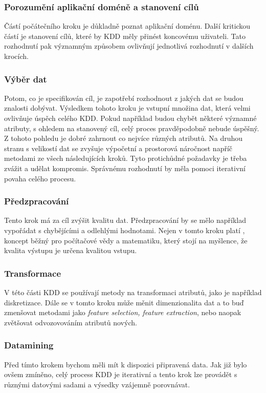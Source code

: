 \documentclass[thesis=M,czech]{FITthesis}[2012/06/26]
\begin{document}
\subsubsection*{Porozumění aplikační doméně a stanovení cílů}
Částí počátečního kroku je důkladně poznat aplikační doménu. Další kritickou částí je stanovení cílů, které by KDD měly přinést koncovému uživateli. Tato rozhodnutí pak významným způsobem ovlivňují jednotlivá rozhodnutí v dalších krocích.
 		
\subsubsection*{Výběr dat}
Potom, co je specifikován cíl, je zapotřebí rozhodnout z jakých dat se budou znalosti dobývat. 
Výsledkem tohoto kroku je vstupní množina dat, která velmi ovlivňuje úspěch celého KDD. Pokud například budou chybět některé významné atributy, s ohledem na stanovený cíl, celý proces pravděpodobně nebude úspěšný. Z tohoto pohledu je dobré zahrnout co nejvíce různých atributů. Na druhou stranu s velikostí dat se zvyšuje výpočetní a prostorová náročnost napříč metodami ze všech následujících kroků. Tyto protichůdné požadavky je třeba zvážit a udělat kompromis. Správnému rozhodnutí by měla pomoci iterativní povaha celého procesu.

\subsubsection*{Předzpracování}
Tento krok má za cíl zvýšit kvalitu dat. Předzpracování by se mělo například vypořádat s chybějícími a odlehlými hodnotami. Nejen v tomto kroku platí , koncept běžný pro počítačové vědy a matematiku, který stojí na myšlence, že kvalita výstupu je určena kvalitou vstupu\cite{g_in_g_out}.

\subsubsection*{Transformace }
\label{subsec:transformace}

V této části KDD se používají metody na transformaci atributů, jako je například diskretizace. Dále se v tomto kroku může měnit dimenzionalita dat a to buď zmenšovat metodami jako \textit{feature selection, feature extraction}, nebo naopak zvětšovat odvozovováním atributů nových. 


\subsubsection*{Datamining}
Před tímto krokem bychom měli mít k dispozici připravená data. Jak již bylo ovšem zmíněno, celý process KDD je iterativní a tento krok lze provádět s různými datovými sadami a výsedky vzájemně porovnávat.
\end{document}
